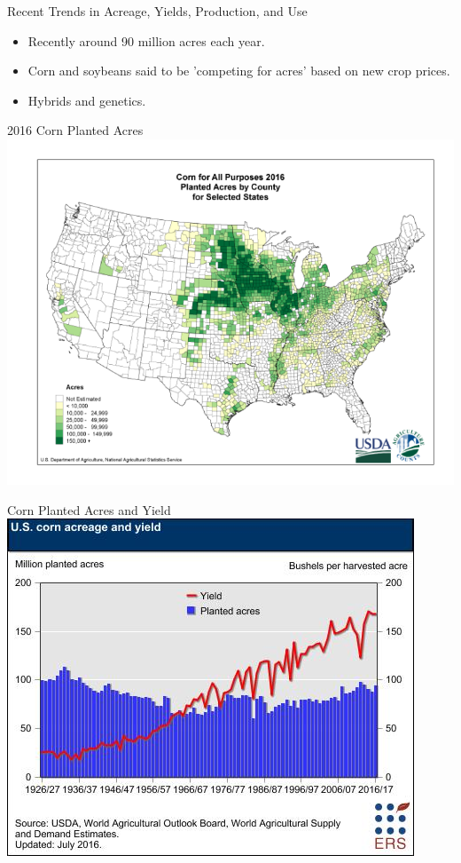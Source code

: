 \documentclass{beamer}
\begin{document}
\begin{frame}[<+-| alert@+>]{Recent Trends in Acreage, Yields, Production, and Use}
\begin{itemize}
\item Recently around 90 million acres each year.
\item Corn and soybeans said to be 'competing for acres' based on new crop prices.
\item Hybrids and genetics.

\end{itemize}

\end{frame}

\begin{frame}{2016 Corn Planted Acres}
\includegraphics[width=\textwidth]{Corn-PA-2016.png}
\end{frame}

\begin{frame}{Corn Planted Acres and Yield}
\includegraphics[width=.75\textwidth]{Corn-PA-Yield.png}
\end{frame}
\end{document}
